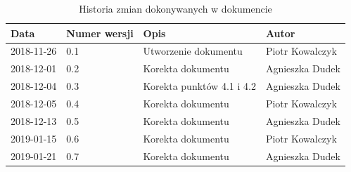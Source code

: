 \documentclass{article}
\begin{document}
\begin{titlepage}







\end{titlepage}

\addtocounter{page}{1}
\newpage

\begin{table}[h!]
	\begin{center}
		\caption{Historia zmian dokonywanych w dokumencie}
		\begin{tabular}{|l|l|l|l|}
			\hline
			Data & Numer wersji & Opis & Autor \\
			\hline \hline
			2018-11-26 & 0.1 & Utworzenie dokumentu & Piotr Kowalczyk \\
			\hline 
			2018-12-01 & 0.2 & Korekta dokumentu & Agnieszka Dudek \\
			\hline
			2018-12-04 & 0.3 & Korekta punktów 4.1 i 4.2 & Agnieszka Dudek \\
			\hline
			2018-12-05 & 0.4 & Korekta dokumentu & Piotr Kowalczyk \\
			\hline
			2018-12-13 & 0.5 & Korekta dokumentu & Agnieszka Dudek \\
			\hline
			2019-01-15 & 0.6 & Korekta dokumentu & Piotr Kowalczyk \\
			\hline			
			2019-01-21 & 0.7 & Korekta dokumentu & Agnieszka Dudek \\
			\hline
    \end{tabular}
	\end{center}
\end{table}	
\end{document}
